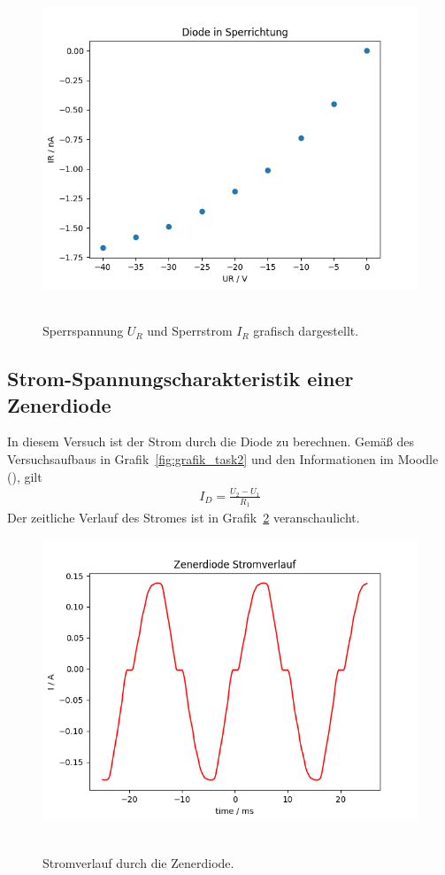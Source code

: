 \documentclass{article}
\begin{document}
\begin{figure}[H]
\caption{Sperrspannung $U_R$ und Sperrstrom $I_R$ grafisch dargestellt.}
\label{fig:grafik_task1b}
{\centering
\includegraphics[scale=0.7]{bilder/task1b.png}
~
}
\end{figure}

\subsection{Strom-Spannungscharakteristik einer Zenerdiode}

In diesem Versuch ist der Strom durch die Diode zu berechnen. Gemäß des Versuchsaufbaus in Grafik~\ref{fig:grafik_task2} und den Informationen im Moodle (\cite{moodle}), gilt
\begin{align*}
I_D = \frac{U_2-U_1}{R_1}
\end{align*}
Der zeitliche Verlauf des Stromes ist in Grafik~\ref{fig:task2_auswertung1} veranschaulicht.

\begin{figure}[H]
\caption{Stromverlauf durch die Zenerdiode.}
\label{fig:task2_auswertung1}
{\centering
\includegraphics[scale=0.6]{bilder/task2_I.png}
~
}
\end{figure}
\end{document}

